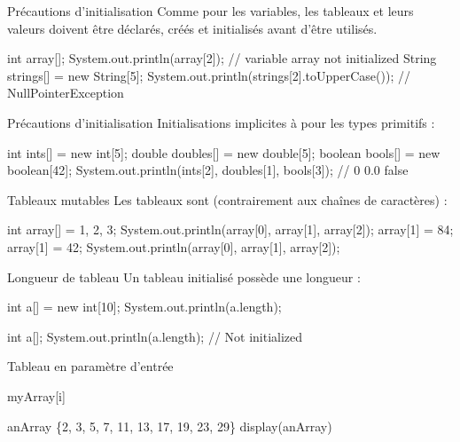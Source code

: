 \begin{frame}[fragile]{Précautions d'initialisation}
  Comme pour les variables, les tableaux et leurs valeurs doivent être
  déclarés, créés et initialisés avant d'être utilisés.
\begin{java}
int array[];
System.out.println(array[2]);
// variable array not initialized
String strings[] = new String[5];
System.out.println(strings[2].toUpperCase());
// NullPointerException
\end{java}
\end{frame}

\begin{frame}[fragile]{Précautions d'initialisation}
  Initialisations implicites à  \fg pour les types primitifs :
\begin{java}
int ints[] = new int[5];
double doubles[] = new double[5];
boolean bools[] = new boolean[42];
System.out.println(ints[2], doubles[1], bools[3]);
// 0 0.0 false
\end{java}
\end{frame}

\begin{frame}[fragile]{Tableaux mutables}
  Les tableaux sont  (contrairement aux chaînes de
  caractères) :
\begin{java}
int array[] = {1, 2, 3};
System.out.println(array[0], array[1], array[2]);
array[1] = 84;
array[1] = 42;
System.out.println(array[0], array[1], array[2]);
\end{java}
\end{frame}

\begin{frame}[fragile]{Longueur de tableau}
  Un tableau initialisé possède une longueur :
\begin{java}
  int a[] = new int[10];
  System.out.println(a.length);
\end{java}

\pause
\begin{wrong}
\begin{java}
  int a[];
  System.out.println(a.length);
  // Not initialized
\end{java}
\end{wrong}
\end{frame}

\begin{frame}{Tableau en paramètre d'entrée}
\begin{pseudocode}
    \Write myArray[i]
  \EndFor
\EndAlgo

\Let anArray \Gets \{2, 3, 5, 7, 11, 13, 17, 19, 23, 29\}
\Stmt display(anArray)
\end{pseudocode}
\end{frame}


